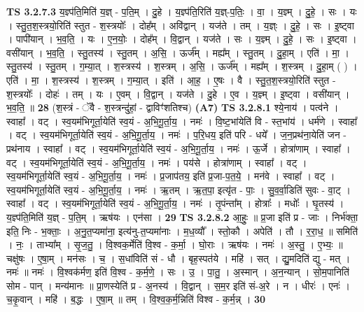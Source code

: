 \documentclass[17pt]{extarticle}
\begin{document}
                  \newline
                                \textbf{ TS 3.2.7.3} \newline
                  य॒ज्ञ्प॑ति॒मिति॑ य॒ज्ञ् - प॒ति॒म् । दु॒हे । य॒ज्ञ्प॑ति॒रिति॑ य॒ज्ञ्-प॒तिः॒ । वा॒ । य॒ज्ञ्म् । दु॒हे॒ । सः । यः । स्तु॒त॒श॒स्त्रयो॒रिति॑ स्तुत - श॒स्त्रयोः᳚ । दोह᳚म् । अवि॑द्वान् । यज॑ते । तम् । य॒ज्ञ्ः । दु॒हे॒ । सः । इ॒ष्ट्वा । पापी॑यान् । भ॒व॒ति॒ । यः । ए॒न॒योः॒ । दोह᳚म् । वि॒द्वान् । यज॑ते । सः । य॒ज्ञ्म् । दु॒हे॒ । सः । इ॒ष्ट्वा । वसी॑यान् । भ॒व॒ति॒ । स्तु॒तस्य॑ । स्तु॒तम् । अ॒सि॒ । ऊर्ज᳚म् । मह्य᳚म् । स्तु॒तम् । दु॒हा॒म् । एति॑ । मा॒ । स्तु॒तस्य॑ । स्तु॒तम् । ग॒म्या॒त् । श॒स्त्रस्य॑ । श॒स्त्रम् । अ॒सि॒ । ऊर्ज᳚म् । मह्य᳚म् । श॒स्त्रम् । दु॒हा॒म् ( ) । एति॑ । मा॒ । श॒स्त्रस्य॑ । श॒स्त्रम् । ग॒म्या॒त् । इति॑ । आ॒ह॒ । ए॒षः । वै । स्तु॒त॒श॒स्त्रयो॒रिति॑ स्तुत - श॒स्त्रयोः᳚ । दोहः॑ । तम् । यः । ए॒वम् । वि॒द्वान् । यज॑ते । दु॒हे । ए॒व । य॒ज्ञ्म् । इ॒ष्ट्वा । वसी॑यान् । भ॒व॒ति॒ ॥ \textbf{  28} \newline
                  \newline
                      (श॒स्त्रं - ॅवै - श॒स्त्रन्दु॑हां॒ - द्वाविꣳ॑शतिश्च)  \textbf{(A7)} \newline \newline
                                \textbf{ TS 3.2.8.1} \newline
                  श्ये॒नाय॑ । पत्व॑ने । स्वाहा᳚ । वट् । स्व॒यम॑भिगूर्ता॒येति॑ स्व॒यं - अ॒भि॒गू॒र्ता॒य॒ । नमः॑ । वि॒ष्ट॒भांयेति॑ वि - स्त॒भांय॑ । धर्म॑णे । स्वाहा᳚ । वट् । स्व॒यम॑भिगूर्ता॒येति॑ स्व॒यं - अ॒भि॒गू॒र्ता॒य॒ । नमः॑ । प॒रि॒धय॒ इति॑ परि - धये᳚ । ज॒न॒प्रथ॑ना॒येति॑ जन - प्रथ॑नाय । स्वाहा᳚ । वट् । स्व॒यम॑भिगूर्ता॒येति॑ स्व॒यं - अ॒भि॒गू॒र्ता॒य॒ । नमः॑ । ऊ॒र्जे । होत्रा॑णाम् । स्वाहा᳚ । वट् । स्व॒यम॑भिगूर्ता॒येति॑ स्व॒यं - अ॒भि॒गू॒र्ता॒य॒ । नमः॑ । पय॑से । होत्रा॑णाम् । स्वाहा᳚ । वट् । स्व॒यम॑भिगूर्ता॒येति॑ स्व॒यं - अ॒भि॒गू॒र्ता॒य॒ । नमः॑ । प्र॒जाप॑तय॒ इति॑ प्र॒जा-प॒त॒ये॒ । मन॑वे । स्वाहा᳚ । वट् । स्व॒यम॑भिगूर्ता॒येति॑ स्व॒यं - अ॒भि॒गू॒र्ता॒य॒ । नमः॑ । ऋ॒तम् । ऋ॒त॒पा॒ इत्यृ॑त - पाः॒ । सु॒व॒र्वा॒डिति॑ सुवः - वा॒ट् । स्वाहा᳚ । वट् । स्व॒यम॑भिगूर्ता॒येति॑ स्व॒यं - अ॒भि॒गू॒र्ता॒य॒ । नमः॑ । तृ॒पंन्ता᳚म् । होत्राः᳚ । मधोः᳚ । घृ॒तस्य॑ । य॒ज्ञ्प॑ति॒मिति॑ य॒ज्ञ् - प॒ति॒म् । ऋष॑यः । एन॑सा । \textbf{  29} \newline
                  \newline
                                \textbf{ TS 3.2.8.2} \newline
                  आ॒हुः॒ ॥ प्र॒जा इति॑ प्र - जाः । निर्भ॑क्ता॒ इति॒ निः - भ॒क्ताः॒ । अ॒नु॒त॒प्यमा॑ना॒ इत्य॑नु-त॒प्यमा॑नाः । म॒ध॒व्यौ᳚ । स्तो॒कौ । अपेति॑ । तौ । र॒रा॒ध॒ ॥ समिति॑ । नः॒ । ताभ्या᳚म् । सृ॒ज॒तु॒ । वि॒श्वक॒र्मेति॑ वि॒श्व - क॒र्मा॒ । घो॒राः । ऋष॑यः । नमः॑ । अ॒स्तु॒ । ए॒भ्यः॒ ॥ चक्षु॑षः । ए॒षा॒म् । मन॑सः । च॒ । स॒धांविति॑ सं - धौ । बृह॒स्पत॑ये । महि॑ । सत् । द्यु॒मदिति॑ द्यु - मत् । नमः॑ ॥ नमः॑ । वि॒श्वक॑र्मण॒ इति॑ वि॒श्व - क॒र्म॒णे॒ । सः । उ॒ । पा॒तु॒ । अ॒स्मान् । अ॒न॒न्यान् । सो॒म॒पानिति॑ सोम - पान् । मन्य॑मानः ॥ प्रा॒णस्येति॑ प्र - अ॒नस्य॑ । वि॒द्वान् । स॒म॒र इति॑ सं-अ॒रे । न । धीरः॑ । एनः॑ । च॒कृ॒वान् । महि॑ । ब॒द्धः । ए॒षा॒म् ॥ तम् । वि॒श्व॒क॒र्म॒न्निति॑ विश्व - क॒र्म॒न्न् । \textbf{  30} \newline
\end{document}
